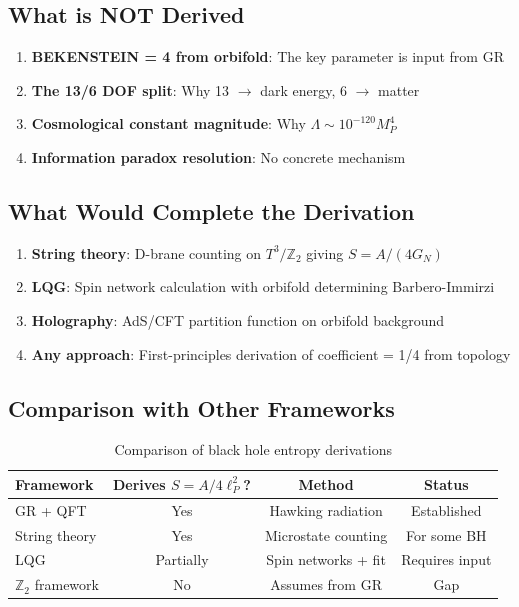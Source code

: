 \documentclass[12pt,a4paper]{article}
\begin{document}
\subsection{What is NOT Derived}

\begin{enumerate}
    \item \textbf{BEKENSTEIN = 4 from orbifold}: The key parameter is input from GR
    \item \textbf{The 13/6 DOF split}: Why 13 $\to$ dark energy, 6 $\to$ matter
    \item \textbf{Cosmological constant magnitude}: Why $\Lambda \sim 10^{-120} M_P^4$
    \item \textbf{Information paradox resolution}: No concrete mechanism
\end{enumerate}

\subsection{What Would Complete the Derivation}

\begin{enumerate}
    \item \textbf{String theory}: D-brane counting on $T^3/\mathbb{Z}_2$ giving $S = A/(4G_N)$
    \item \textbf{LQG}: Spin network calculation with orbifold determining Barbero-Immirzi
    \item \textbf{Holography}: AdS/CFT partition function on orbifold background
    \item \textbf{Any approach}: First-principles derivation of coefficient = 1/4 from topology
\end{enumerate}

\subsection{Comparison with Other Frameworks}

\begin{table}[h]
\centering
\begin{tabular}{lccc}
\toprule
Framework & Derives $S = A/4\ell_P^2$? & Method & Status \\
\midrule
GR + QFT & Yes & Hawking radiation & Established \\
String theory & Yes & Microstate counting & For some BH \\
LQG & Partially & Spin networks + fit & Requires input \\
$\mathbb{Z}_2$ framework & No & Assumes from GR & Gap \\
\bottomrule
\end{tabular}
\caption{Comparison of black hole entropy derivations}
\end{table}
\end{document}
